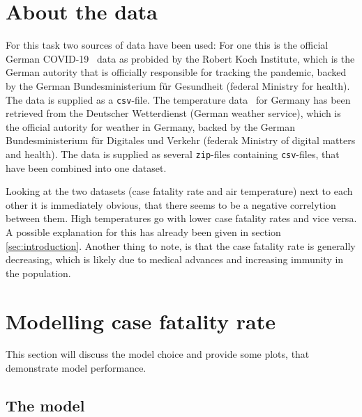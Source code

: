 \documentclass{article}
\begin{document}
\section{About the data}

For this task two sources of data have been used: For one this is the official German COVID-19~\cite{rki_2022} data as probided by the Robert Koch Institute, which is the German autority that is officially responsible for tracking the pandemic, backed by the German Bundesministerium für Gesundheit (federal Ministry for health). The data is supplied as a \texttt{csv}-file. The temperature data~\cite{dwd_2022} for Germany has been retrieved from the Deutscher Wetterdienst (German weather service), which is the official autority for weather in Germany, backed by the German Bundesministerium für Digitales und Verkehr (federak Ministry of digital matters and health). The data is supplied as several \texttt{zip}-files containing \texttt{csv}-files, that have been combined into one dataset.

Looking at the two datasets (case fatality rate and air temperature) next to each other it is immediately obvious, that there seems to be a negative correlytion between them. High temperatures go with lower case fatality rates and vice versa. A possible explanation for this has already been given in section \ref{sec:introduction}. Another thing to note, is that the case fatality rate is generally decreasing, which is likely due to medical advances and increasing immunity in the population.

\section{Modelling case fatality rate}
\label{sec:modelling}

This section will discuss the model choice and provide some plots, that demonstrate model performance.

\subsection{The model}
\end{document}

